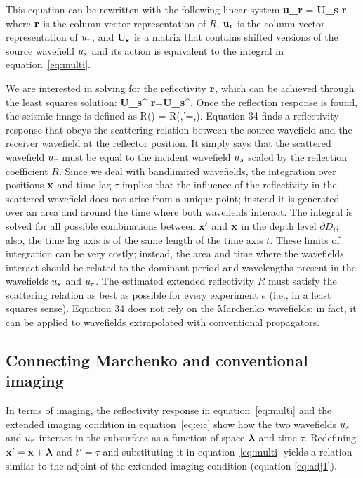 This equation can be rewritten  with the following linear system
\beq
  {\bf u_r} = {\bf U_s} {\bf r},
\eeq
where $\bf r$ is the column vector representation of $R$, ${\bf u_r}$ is the column vector
representation of $u_r$, and $\bf U_s$ is a matrix that contains shifted versions of 
the source wavefield $u_s$ and its action is equivalent to the integral in equation~\ref{eq:multi}.


We are interested in solving for the reflectivity $\bf r$, which can be achieved 
through the least squares solution:
\beq
  {\bf U_s}^ {\bf r}={\bf U_s}^. 
  \label{eq:mddinv}
\eeq
Once the reflection response is found, the seismic image is defined as  
\beq
R(\xx) = R(\xx,\xx'=\xx,). 
\eeq
Equation 34 finds a reflectivity response that obeys the scattering relation between 
the source wavefield and the receiver wavefield at the reflector position. It simply says that
the scattered wavefield $u_r$ must be equal to the incident wavefield $u_s$ scaled by the 
reflection coefficient $R$. Since we deal with bandlimited wavefields, the integration over
positions ${\bf x}$ and  time lag $\tau$ implies that the influence of the reflectivity in the
scattered wavefield does not arise from a unique point; instead it is generated over an 
area and around the time where both wavefields interact. The integral is solved for
all possible combinations between ${\bf x}'$ and ${\bf x}$ in the depth level $\partial D_i$; also,
the time lag axis is of the same length of the time axis $t$. These limits of integration 
can be very costly; instead, the area and time where the wavefields interact should be related
to the dominant period and wavelengths present in the wavefields $u_s$ and $u_r$. 
The estimated extended reflectivity $R$ must satisfy the scattering relation as best as possible for 
every experiment $e$ (i.e., in a least squares sense). Equation 34 does 
not rely on the Marchenko wavefields; in fact, it can be applied to wavefields extrapolated
with conventional propagators.  

\subsection{Connecting Marchenko and conventional imaging}

In terms of imaging, the reflectivity response in equation~\ref{eq:multi} and the extended 
imaging condition in equation~\ref{eq:eic} show how the two wavefields $u_s$ and $u_r$ interact
in the subsurface as a function of space ${\boldsymbol{\lambda}}$ and time $\tau$.
 Redefining ${\bf x}' = {\bf x} + {\boldsymbol{\lambda}}$ and  $t'=\tau$ and substituting it in equation~\ref{eq:multi} yields
a relation similar to the adjoint of the extended imaging condition (equation \ref{eq:adj1}).


